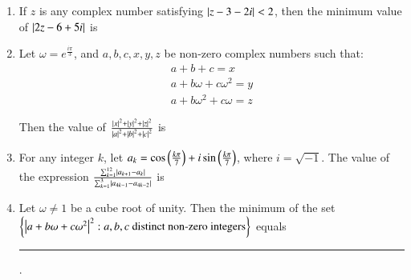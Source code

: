 \documentclass[journal,12pt,twocolumn]{IEEEtran}
\theoremstyle{remark}
\begin{document}
\begin{enumerate}[label=\arabic*)]
	\item If $z$ is any complex number satisfying $\left\vert z - 3 - 2i\right\vert < 2$, then the
		minimum value of $\left\vert2z - 6 + 5i\right\vert$ is
		\hfill {}

	\item Let $\omega = e^{\frac{i\pi}3}$, and $a, b, c, x, y, z$ be non-zero complex numbers such that:
		\hfill {}
		\begin{gather*}
			a + b + c = x \\
			a + b\omega + c\omega^2 = y \\
			a + b\omega^2 + c\omega = z 
		\end{gather*}

		Then the value of $\frac {\left\vert x\right\vert^2 + \left\vert y\right\vert^2 + \left\vert z\right\vert^2} {\left\vert a\right\vert^2 + \left\vert b\right\vert^2 + \left\vert c\right\vert^2}$ is

	\item For any integer $k$, let $a_k = \cos\left(\frac{k\pi}{7}\right) + i\sin\left(\frac{k\pi}{7}\right)$, where	
		$i = \sqrt{-1}$. The value of the expression $\frac {\sum_{k=1}^{12} \left\vert a_{k+1} - a_k\right\vert} {\sum_{k=1}^{3} \left\vert a_{4k-1} - a_{4k-2}\right\vert}$ is
		\hfill {}

	\item Let $\omega \ne 1$ be a cube root of unity. Then the minimum of the set $\left\{\left\vert a + b\omega + c\omega^2\right\vert^2: a,b,c 
		\text{ distinct non-zero integers}\right\}$ equals \rule{1cm}{0.15mm}.
		\hfill {}
\end{enumerate}
\end{document}
